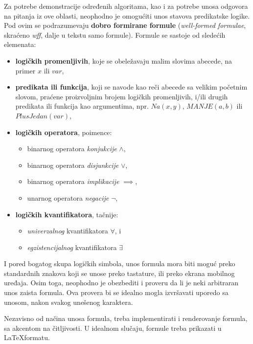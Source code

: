 Za potrebe demonstracije određenih algoritama, kao i za potrebe unosa odgovora na pitanja iz ove oblasti, neophodno je omogućiti unos stavova predikatske logike. Pod ovim se podrazumevaju \textbf{dobro formirane formule} (\textit{well-formed formulae}, skraćeno \textit{wff}, dalje u tekstu samo formule). Formule se sastoje od sledećih elemenata:
\begin{itemize}
\item \textbf{logičkih promenljivih}, koje se obeležavaju malim slovima abecede, na primer $x$ ili $var$,
\item \textbf{predikata ili funkcija}, koji se navode kao reči abecede sa velikim početnim slovom, praćene proizvoljnim brojem logičkih promenljivih, i/ili drugih predikata ili funkcija kao argumentima, npr. $\mathit{Na}(x, y)$, $\mathit{MANJE}(a, b)$ ili $\mathit{PlusJedan}(var)$,
\item \textbf{logičkih operatora}, poimence:
\begin{itemize}
\item binarnog operatora \emph{konjukcije} $\land$,
\item binarnog operatora \emph{disjunkcije} $\lor$,
\item binarnog operatora \emph{implikacije} $\implies$,
\item unarnog operatora \emph{negacije} $\neg$,
\end{itemize}
\item \textbf{logičkih kvantifikatora}, tačnije:
\begin{itemize}
\item \emph{univerzalnog} kvantifikatora $\forall$, i
\item \emph{egzistencijalnog} kvantifikatora $\exists$
\end{itemize}
\end{itemize}
I pored bogatog skupa logičkih simbola, unos formula mora biti moguć preko standardnih znakova koji se unose preko tastature, ili preko ekrana mobilnog uređaja. Osim toga, neophodno je obezbediti i proveru da li je neki arbitraran unos zaista formula. Ova provera bi se idealno mogla izvršavati uporedo sa unosom, nakon svakog unešenog karaktera.

Nezavisno od načina unosa formula, treba implementirati i renderovanje formula, sa akcentom na čitljivosti. U idealnom slučaju, formule treba prikazati u \LaTeX \space formatu.

